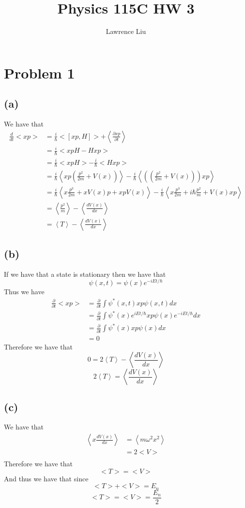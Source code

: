 \documentclass[11pt]{article}
\author{Lawrence Liu}
\title{Physics 115C HW 3}
\begin{document}
\maketitle
\section*{Problem 1}
\subsection*{(a)}
We have that 
\begin{align*}
    \frac{d}{dt}<xp> &= \frac{i}{\hbar}<[xp,H]>+\left<\frac{\partial xp}{\partial t}\right>\\
    &= \frac{i}{\hbar}<xpH-Hxp>\\
    &= \frac{i}{\hbar}<xpH>-\frac{i}{\hbar}<Hxp>\\
    &= \frac{i}{\hbar}\left<xp\left(\frac{p^2}{2m}+V(x)\right)\right>-\frac{i}{\hbar}\left<\left((\frac{p^2}{2m}+V(x))\right)xp\right>\\
    &= \frac{i}{\hbar}\left<x\frac{p^3}{2m}+xV(x)p+xpV(x)\right>-\frac{i}{\hbar}\left<x\frac{p^3}{2m}+i\hbar\frac{p^2}{m}+V(x)xp\right>\\
    &= \left<\frac{p^2}{m}\right>-\left<\frac{dV(x)}{dx}\right>\\
    &= \left<T\right>-\left<\frac{dV(x)}{dx}\right>
\end{align*}
\subsection*{(b)}
If we have that a state is stationary then we have that 
$$\psi(x,t) = \psi(x)e^{-iEt/\hbar}$$
Thus we have 
\begin{align*}
\frac{\partial}{\partial t} <xp> &= \frac{\partial}{\partial t}\int \psi^*(x,t) xp \psi(x,t) dx\\
&= \frac{\partial}{\partial t}\int \psi^*(x)e^{iEt/\hbar} xp \psi(x)e^{-iEt/\hbar} dx\\
&= \frac{\partial}{\partial t}\int \psi^*(x) xp \psi(x) dx\\
&= 0
\end{align*}
Therefore we have that 
$$0 = 2\left<T\right>-\left<\frac{dV(x)}{dx}\right>$$
$$2\left<T\right> = \left<\frac{dV(x)}{dx}\right>$$
\subsection*{(c)}
We have that 
\begin{align*}
\left<x\frac{dV(x)}{dx}\right> &= \left<m\omega^2x^2\right>\\
&= 2<V>\\
\end{align*}
Therefore we have that 
$$<T> = <V>$$
And thus we have that since 
$$<T>+<V>=E_n$$
$$<T>=<V>=\frac{E_n}{2}$$
\end{document}
